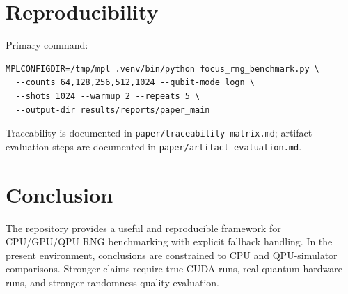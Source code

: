 \documentclass[10pt,conference]{IEEEtran}
\begin{document}
\section{Reproducibility}
Primary command:
\begin{verbatim}
MPLCONFIGDIR=/tmp/mpl .venv/bin/python focus_rng_benchmark.py \
  --counts 64,128,256,512,1024 --qubit-mode logn \
  --shots 1024 --warmup 2 --repeats 5 \
  --output-dir results/reports/paper_main
\end{verbatim}

Traceability is documented in \texttt{paper/traceability-matrix.md}; artifact evaluation steps are documented in \texttt{paper/artifact-evaluation.md}.

\section{Conclusion}
The repository provides a useful and reproducible framework for CPU/GPU/QPU RNG benchmarking with explicit fallback handling. In the present environment, conclusions are constrained to CPU and QPU-simulator comparisons. Stronger claims require true CUDA runs, real quantum hardware runs, and stronger randomness-quality evaluation.



\end{document}
